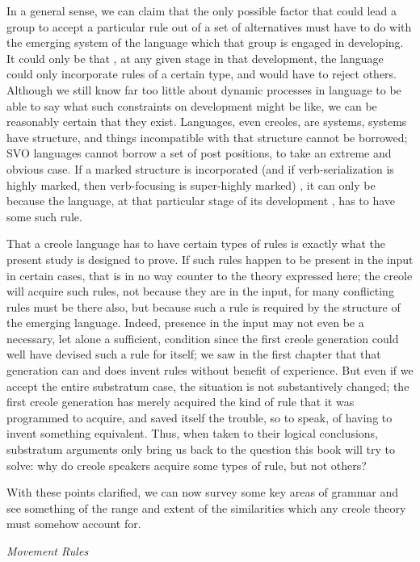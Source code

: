 In a general sense, we can claim that the only possible factor that could lead a group to accept a particular rule out of a set of alternatives must have to do with the emerging system of the language which that group is engaged in developing. It could only be that , at any given stage in that development, the language could only incorpor\-ate rules of a certain type, and would have to reject others. Although we still know far too little about dynamic processes in language to be able to say what such constraints on development might be like, we can be reasonably certain that they exist. Languages, even creoles, are systems, systems have structure, and things incompatible with that structure cannot be borrowed; SVO languages cannot borrow a set of post positions, to take an extreme and obvious case. If a marked struc\-ture is incorporated (and if verb-serialization is highly marked, then verb-focusing is super-highly marked) , it can only be because the language, at that particular stage of its development , has to have some
such rule.

That a creole language has to have certain types of rules is
exactly what the present study is designed to prove. If such rules happen to be present in the input in certain cases, that is in no way counter to the theory expressed here; the creole will acquire such rules, not because they are in the input, for many conflicting rules must be there also, but because such a rule is required by the struc\-ture of the emerging language. Indeed, presence in the input may not even be a necessary, let alone a sufficient, condition since the first creole generation could well have devised such a rule for itself; we saw in the first chapter that that generation can and does invent rules without benefit of experience. But even if we accept the entire sub\-stratum case, the situation is not substantively changed; the first creole generation has merely acquired the kind of rule that it was programmed to acquire, and saved itself the trouble, so to speak, of having to invent something equivalent. Thus, when taken to their logical conclusions, substratum arguments only bring us back to the question this book will try to solve: why do creole speakers acquire some types of rule, but not others?

With these points clarified, we can now survey some key areas of grammar and see something of the range and extent of the similarities which any creole theory must somehow account for.

\textit{Movement Rules}


